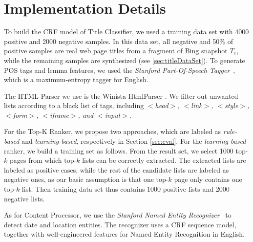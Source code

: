 \section{Implementation Details}
\label{sec:imp}

To build the CRF model of Title Classifier, we used a training data
set with 4000 positive and 2000 negative samples.
In this data set, all negative and 50\% of positive samples are real
web page titles from a fragment of Bing snapshot $T_{1}$,
while the remaining samples are synthesized (see \ref{sec:titleDataSet}).
To generate POS tags and lemma features,
we used the \emph{Stanford Part-Of-Speech Tagger}~\cite{toutanova2003feature},
which is a maximum-entropy tagger for English.  %

The HTML Parser we use is the Winista HtmlParser \cite{winista}. 
We filter out unwanted lists according to a black list of
tags, including \emph{$<$head$>$, $<$link$>$, $<$style$>$, $<$form$>$,
  $<$iframe$>$, and $<$input$>$}.

For the Top-K Ranker, we propose two approaches, which are labeled as
\emph{rule-based} and \emph{learning-based}, respectively in
Section \ref{sec:eval}.
For the \emph{learning-based} ranker, we build a training set as
follows. 
From the result set, we
select 1000 top-$k$ pages from which top-$k$ lists can be correctly
extracted.  The extracted lists are labeled as positive cases,
while the rest of the candidate lists are labeled as negative ones, 
as our basic assumption is that one top-$k$ page only contains one top-$k$
list.  Then training data set thus contains 1000 positive lists and
2000 negative lists.

As for Content Processor, we use the \emph{Stanford Named Entity
Recognizer}~\cite{finkel2005incorporating} to detect date and
location entities.  The recognizer uses a CRF sequence model,
together with well-engineered features for Named Entity Recognition
in English. 
